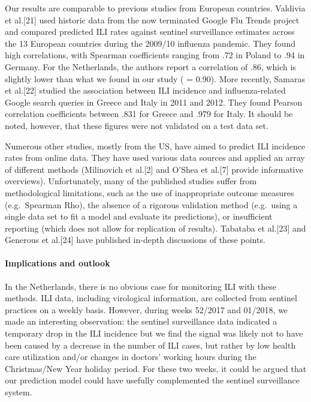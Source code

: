 \documentclass[]{article}
\let\oldparagraph\paragraph
\renewcommand{\paragraph}[1]{\oldparagraph{#1}\mbox{}}
\begin{document}
Our results are comparable to previous studies from European countries.
Valdivia et al.{[}21{]} used historic data from the now terminated
Google Flu Trends project and compared predicted ILI rates against
sentinel surveillance estimates across the 13 European countries during
the 2009/10 influenza pandemic. They found high correlations, with
Spearman coefficients ranging from .72 in Poland to .94 in Germany. For
the Netherlands, the authors report a correlation of .86, which is
slightly lower than what we found in our study ( = 0.90). More recently,
Samaras et al.{[}22{]} studied the association between ILI incidence and
influenza-related Google search queries in Greece and Italy in 2011 and
2012. They found Pearson correlation coefficients between .831 for
Greece and .979 for Italy. It should be noted, however, that these
figures were not validated on a test data set.

Numerous other studies, mostly from the US, have aimed to predict ILI
incidence rates from online data. They have used various data sources
and applied an array of different methods (Milinovich et al.{[}2{]} and
O'Shea et al.{[}7{]} provide informative overviews). Unfortunately, many
of the published studies suffer from methodological limitations, such as
the use of inappropriate outcome measures (e.g.~Spearman Rho), the
absence of a rigorous validation method (e.g.~using a single data set to
fit a model and evaluate its predictions), or insufficient reporting
(which does not allow for replication of results). Tabataba et
al.{[}23{]} and Generous et al.{[}24{]} have published in-depth
discussions of these points.

\hypertarget{implications-and-outlook}{%
\paragraph{\texorpdfstring{\textbf{Implications and
outlook}}{Implications and outlook}}\label{implications-and-outlook}}

In the Netherlands, there is no obvious case for monitoring ILI with
these methods. ILI data, including virological information, are
collected from sentinel practices on a weekly basis. However, during
weeks 52/2017 and 01/2018, we made an interesting observation: the
sentinel surveillance data indicated a temporary drop in the ILI
incidence but we find the signal was likely not to have been caused by a
decrease in the number of ILI cases, but rather by low health care
utilization and/or changes in doctors' working hours during the
Christmas/New Year holiday period. For these two weeks, it could be
argued that our prediction model could have usefully complemented the
sentinel surveillance system.
\end{document}
